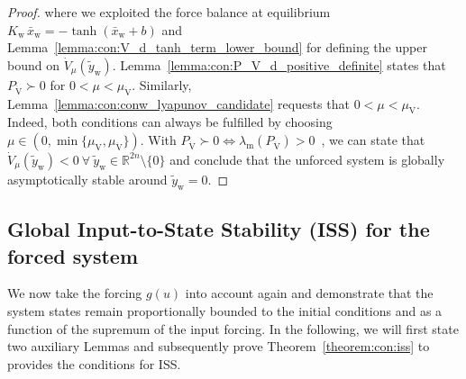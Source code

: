 \begin{proof}
    where we exploited the force balance at equilibrium $K_\mathrm{w} \, \bar{x}_\mathrm{w} = -\tanh(\bar{x}_\mathrm{w} + b)$ and Lemma~\ref{lemma:con:V_d_tanh_term_lower_bound} for defining the upper bound on $\dot{V}_\mu(\tilde{y}_\mathrm{w})$. Lemma~\ref{lemma:con:P_V_d_positive_definite} states that $P_{\dot{\mathrm{V}}} \succ 0$ for $0 < \mu < \mu_{\dot{\mathrm{V}}}$. Similarly, Lemma~\ref{lemma:con:conw_lyapunov_candidate} requests that $0 < \mu < \mu_{\mathrm{V}}$. Indeed, both conditions can always be fulfilled by choosing $\mu \in \left (0, \min \{ \mu_{\mathrm{V}}, \mu_{\dot{\mathrm{V}}} \} \right )$. 
    With $P_{\dot{\mathrm{V}}} \succ 0 \Leftrightarrow \lambda_\mathrm{m}\left(P_{\dot{\mathrm{V}}} \right) > 0$~\citep{golub2013matrix}, we can state that $\dot{V}_\mu(\tilde{y}_\mathrm{w}) < 0 \: \forall \: \tilde{y}_\mathrm{w} \in \mathbb{R}^{2n} \setminus \{0 \}$ and conclude that the unforced system is globally asymptotically stable around $\tilde{y}_\mathrm{w} = 0$.
\end{proof}

\subsection{Global Input-to-State Stability (ISS) for the forced system} 
We now take the forcing $g(u)$ into account again and demonstrate that the system states remain proportionally bounded to the initial conditions and as a function of the supremum of the input forcing.
In the following, we will first state two auxiliary Lemmas and subsequently prove Theorem~\ref{theorem:con:iss} to provides the conditions for \gls{ISS}.

